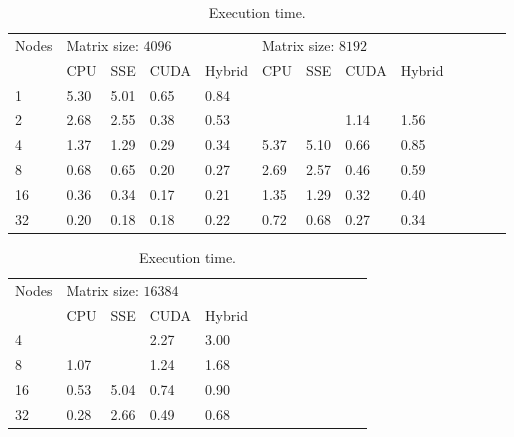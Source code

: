 \begin{table}
\centering
\begin{tabular}{*{13}{l}}
\hline
Nodes & \multicolumn{4}{l}{Matrix size: $4096$} & \multicolumn{4}{l}{Matrix size: $8192$} \\
 & CPU & SSE & CUDA & Hybrid & CPU & SSE & CUDA & Hybrid \\
\hline
1 & 5.30 & 5.01 & 0.65 & 0.84 &  & & & \\
2 & 2.68 & 2.55 & 0.38 & 0.53 &  & & 1.14 & 1.56 \\
4 & 1.37 & 1.29 & 0.29 & 0.34 & 5.37 & 5.10 & 0.66 & 0.85 \\
8 & 0.68 & 0.65 & 0.20 & 0.27 & 2.69 & 2.57 & 0.46 & 0.59 \\
16& 0.36 & 0.34 & 0.17 & 0.21 & 1.35 & 1.29 & 0.32 & 0.40 \\
32& 0.20 & 0.18 & 0.18 & 0.22 & 0.72 & 0.68 & 0.27 & 0.34 \\
\hline
\end{tabular}

\vspace*{0.5 cm}

\begin{tabular}{*{13}{l}}
\hline
Nodes & \multicolumn{4}{l}{Matrix size: $16384$} \\
 & CPU & SSE & CUDA & Hybrid \\
\hline
4 &  &  & 2.27 & 3.00 \\
8 & 1.07 &  & 1.24 & 1.68 \\
16& 0.53 & 5.04 & 0.74 & 0.90 \\
32& 0.28 & 2.66 & 0.49 & 0.68 \\
\hline
\end{tabular} \caption{Execution time.} \label{tab:bench-time}
\end{table}

